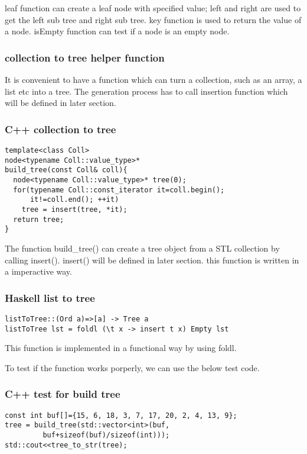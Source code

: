 \documentclass{article}
\begin{document}
leaf function can create a leaf node with specified value; left and right
are used to get the left sub tree and right sub tree. key function is
used to return the value of a node. isEmpty function can test if a node
is an empty node.

\subsubsection{collection to tree helper function} \label{list2tree}
It is convenient to have a function which can turn a collection, such as
an array, a list etc into a tree. The generation process has to call insertion
function which will be defined in later section.

\subsubsection*{C++ collection to tree}
\lstset{language=C++}
\begin{lstlisting}
template<class Coll>
node<typename Coll::value_type>* 
build_tree(const Coll& coll){
  node<typename Coll::value_type>* tree(0);
  for(typename Coll::const_iterator it=coll.begin(); 
      it!=coll.end(); ++it)
    tree = insert(tree, *it);
  return tree;
}
\end{lstlisting}

The function build\_tree() can create a tree object from a STL collection 
by calling insert(). insert() will be defined in later section. this function
is written in a imperactive way.

\subsubsection*{Haskell list to tree}
\lstset{language=Haskell}
\begin{lstlisting}
listToTree::(Ord a)=>[a] -> Tree a
listToTree lst = foldl (\t x -> insert t x) Empty lst
\end{lstlisting}

This function is implemented in a functional way by using foldl.

To test if the function works porperly, we can use the below test code.
\subsubsection*{C++ test for build tree}
\lstset{language=C++}
\begin{lstlisting}
const int buf[]={15, 6, 18, 3, 7, 17, 20, 2, 4, 13, 9};
tree = build_tree(std::vector<int>(buf, 
         buf+sizeof(buf)/sizeof(int)));
std::cout<<tree_to_str(tree);
\end{lstlisting}
\end{document}
